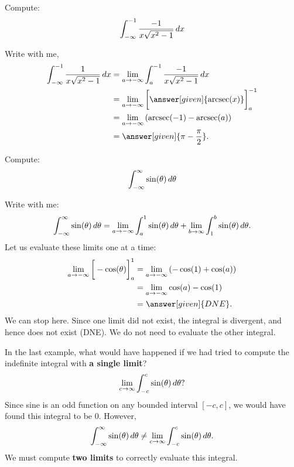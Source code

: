 \documentclass{ximera}
\begin{document}
\begin{example}	
  Compute:
  \[
  \int_{-\infty}^{-1}\frac{-1}{x\sqrt{x^2-1}} \mathop{}\!d x
  \]
  \begin{explanation}
    Write with me,
    \begin{align*}
      \int_{-\infty}^{-1} \frac{1}{x\sqrt{x^2-1}} \d x &= \lim_{a \to -\infty} \int_{a}^{-1} \frac{-1}{x\sqrt{x^2-1}}\d x\\
      &= \lim_{a \to -\infty} \eval{\answer[given]{\arcsec(x)}}_{a}^{-1} \\
      &= \lim_{a \to -\infty} \left(\arcsec(-1) - \arcsec(a)\right)\\
      &= \answer[given]{\pi - \frac{\pi}{2}}.
    \end{align*}
  \end{explanation}
  \end{example}

\begin{example}	
  Compute:
  \[
  \int_{-\infty}^\infty \sin(\theta) \mathop{}\!d \theta
  \]
  \begin{explanation}
    Write with me:
    \[
    \int_{-\infty}^\infty \sin(\theta) \mathop{}\!d \theta = \lim_{a\to -\infty} \int_a^1 \sin(\theta) \mathop{}\!d \theta + \lim_{b\to\infty}\int_1^b \sin(\theta) \mathop{}\!d \theta.
    \]
    Let us evaluate these limits one at a time:
    \begin{align*}  
      \lim_{a\to -\infty}\eval{-\cos(\theta)}_a^1 &= \lim_{a\to -\infty}\left(-\cos(1)+\cos(a)\right)\\
      &= \lim_{a\to -\infty} \cos(a) -\cos(1)\\
      &= \answer[given]{DNE}.
    \end{align*}
    We can stop here. Since one limit did not exist, the integral is
    divergent, and hence does not exist (DNE). We do not need to evaluate the other integral.
  \end{explanation}
\end{example}


\begin{warning}
In the last example, what would have happened if we had tried to
compute the indefinite integral with \textbf{a single limit}?
\[
\lim_{c\to \infty}\int_{-c}^c \sin(\theta)\mathop{}\!d \theta?
\]
Since sine is an odd function on any bounded interval $[-c,c]$, we
would have found this integral to be $0$. However,
\[
\int_{-\infty}^\infty \sin(\theta) \mathop{}\!d \theta \ne \lim_{c\to \infty}\int_{-c}^c \sin(\theta)\mathop{}\!d \theta.
\]
We must compute \textbf{two limits} to correctly evaluate this
integral.
\end{warning}
\end{document}
